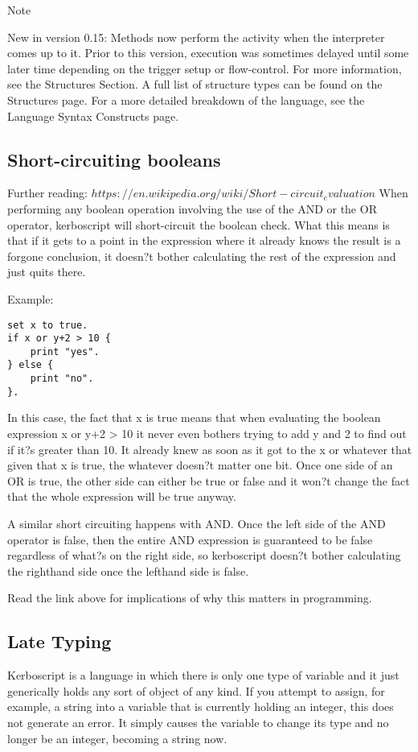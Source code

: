 Note

New in version 0.15: Methods now perform the activity when the interpreter comes up to it. Prior to this version, execution was sometimes delayed until some later time depending on the trigger setup or flow-control.
For more information, see the Structures Section. A full list of structure types can be found on the Structures page. For a more detailed breakdown of the language, see the Language Syntax Constructs page.

\subsection{Short-circuiting booleans}
Further reading: $https://en.wikipedia.org/wiki/Short-circuit_evaluation
$
When performing any boolean operation involving the use of the AND or the OR operator, kerboscript will short-circuit the boolean check. What this means is that if it gets to a point in the expression where it already knows the result is a forgone conclusion, it doesn?t bother calculating the rest of the expression and just quits there.

Example:

\begin{Verbatim}[frame=single]
set x to true.
if x or y+2 > 10 {
    print "yes".
} else {
    print "no".
}.
\end{Verbatim}

In this case, the fact that x is true means that when evaluating the boolean expression x or y+2 > 10 it never even bothers trying to add y and 2 to find out if it?s greater than 10. It already knew as soon as it got to the x or whatever that given that x is true, the whatever doesn?t matter one bit. Once one side of an OR is true, the other side can either be true or false and it won?t change the fact that the whole expression will be true anyway.

A similar short circuiting happens with AND. Once the left side of the AND operator is false, then the entire AND expression is guaranteed to be false regardless of what?s on the right side, so kerboscript doesn?t bother calculating the righthand side once the lefthand side is false.

Read the link above for implications of why this matters in programming.

\subsection{Late Typing}
Kerboscript is a language in which there is only one type of variable and it just generically holds any sort of object of any kind. If you attempt to assign, for example, a string into a variable that is currently holding an integer, this does not generate an error. It simply causes the variable to change its type and no longer be an integer, becoming a string now.

